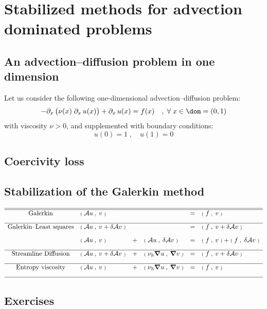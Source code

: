 
\chapter{Stabilized methods for advection dominated problems}\label{chap:sm}

\section{An advection--diffusion problem in one dimension}

Let us consider the following one-dimensional advection--diffusion problem:
\begin{equation*}
- \pdx\bigl(\nu(x)\;\pdx u(x)\bigr) + \pdx u(x) = f(x)\quad,\;\forany x\in \dom = (0,1)
\end{equation*}
with viscosity $\nu > 0$, and supplemented with boundary conditions:
\begin{equation*}
u(0) = 1\;,\quad u(1) = 0
\end{equation*}

\section{Coercivity loss}

\section{Stabilization of the Galerkin method}\label{ssec:stab_galerkin}

\begin{equation*}
\begin{array}{clllll}
\hline
\hline
\mbox{Galerkin}& \Inner{\opA u}{v} && &=& \Inner{f}{v} \\[2ex]

\hline
\mbox{Galerkin--Least squares}& \Inner{\opA u}{v + \delta \opA v} &&&=& \Inner{f}{v + \delta \opA v} \\[2ex]
& \Inner{\opA u}{v} &+& \Inner{\opA u}{\delta \opA v} &=& \Inner{f}{v} + \Inner{f}{\delta \opA v} \\[2ex]

\hline
\mbox{Streamline Diffusion}& \Inner{\opA u}{v + \delta \opA v} &+& \Inner{\nu_h \Grad u}{\Grad v} &=& \Inner{f}{v + \delta \opA v} \\[2ex]

\hline
\mbox{Entropy viscosity}& \Inner{\opA u}{v} &+& \Inner{\nu_h \Grad u}{\Grad v} &=& \Inner{f}{v} \\[2ex]
\hline
\end{array}
\end{equation*}

\section{Exercises}
